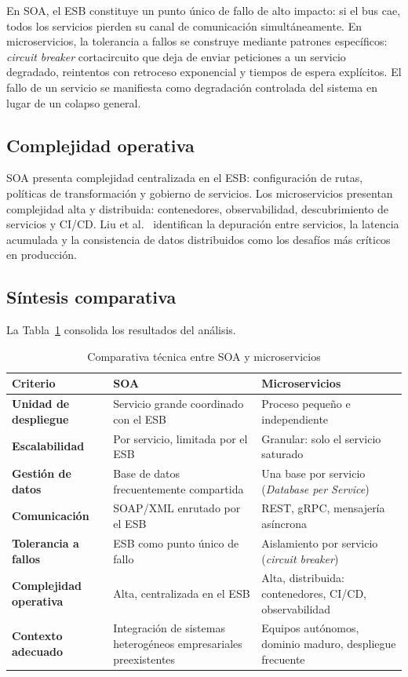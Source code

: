 \documentclass[12pt, a4paper]{article}
\begin{document}
En SOA, el ESB constituye un punto único de fallo de alto impacto: si el bus cae,
todos los servicios pierden su canal de comunicación simultáneamente. En
microservicios, la tolerancia a fallos se construye mediante patrones específicos:
\textit{circuit breaker} cortacircuito que deja de enviar peticiones a un
servicio degradado, reintentos con retroceso exponencial y tiempos de espera
explícitos. El fallo de un servicio se manifiesta como degradación controlada del
sistema en lugar de un colapso general.

\subsection{Complejidad operativa}

SOA presenta complejidad centralizada en el ESB: configuración de rutas, políticas
de transformación y gobierno de servicios. Los microservicios presentan complejidad
alta y distribuida: contenedores, observabilidad, descubrimiento de servicios y
CI/CD. Liu et al.~\cite{liu2020} identifican la depuración entre servicios, la
latencia acumulada y la consistencia de datos distribuidos como los desafíos más
críticos en producción.

\subsection{Síntesis comparativa}

La Tabla~\ref{tab:comparativa} consolida los resultados del análisis.

\begin{table}[H]
\centering
\caption{Comparativa técnica entre SOA y microservicios}
\label{tab:comparativa}
\begin{tabular}{>{\bfseries}p{3.0cm} p{5.0cm} p{5.0cm}}
\toprule
\textbf{Criterio} & \textbf{SOA} & \textbf{Microservicios} \\
\midrule
Unidad de despliegue
  & Servicio grande coordinado con el ESB
  & Proceso pequeño e independiente \\
\addlinespace
Escalabilidad
  & Por servicio, limitada por el ESB
  & Granular: solo el servicio saturado \\
\addlinespace
Gestión de datos
  & Base de datos frecuentemente compartida
  & Una base por servicio (\textit{Database per Service}) \\
\addlinespace
Comunicación
  & SOAP/XML enrutado por el ESB
  & REST, gRPC, mensajería asíncrona \\
\addlinespace
Tolerancia a fallos
  & ESB como punto único de fallo
  & Aislamiento por servicio (\textit{circuit breaker}) \\
\addlinespace
Complejidad operativa
  & Alta, centralizada en el ESB
  & Alta, distribuida: contenedores, CI/CD, observabilidad \\
\addlinespace
Contexto adecuado
  & Integración de sistemas heterogéneos empresariales preexistentes
  & Equipos autónomos, dominio maduro, despliegue frecuente \\
\bottomrule
\end{tabular}
\end{table}
\end{document}
